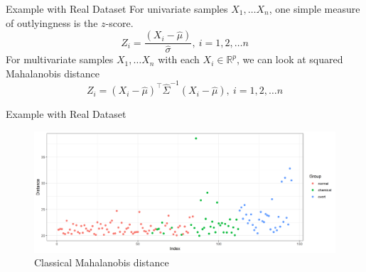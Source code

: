 \documentclass[10pt,xcolor=svgnames]{beamer} %
\newcommand{\R}{\mathbb{R}}
\newcommand{\tr}{^{\intercal}}
\begin{document}
\begin{frame}{Example with Real Dataset}
    For univariate samples $X_1, \dots X_n$, one simple measure of outlyingness is the $z$-score.
    \begin{equation*}
        Z_i = \dfrac{(X_i - \widehat{\mu})}{\widehat{\sigma}}, \ i = 1, 2, \dots n
    \end{equation*}
    \pause 
    For multivariate samples $X_1, \dots X_n$ with each $X_i \in \R^p$, we can look at squared Mahalanobis distance
    \begin{equation*}
        Z_i = (X_i - \widehat{\mu})\tr \widehat{\Sigma}^{-1} (X_i - \widehat{\mu}), \ i = 1, 2, \dots n
    \end{equation*}
\end{frame}


\begin{frame}{Example with Real Dataset}
    \begin{figure}
        \centering
        \includegraphics[width = \textwidth]{Distance-classic.png}
        \caption{Classical Mahalanobis distance}
    \end{figure}
\end{frame}
\end{document}
